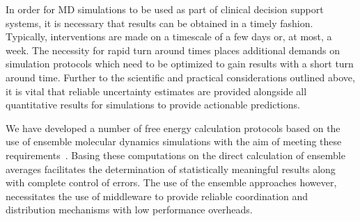 In order for MD simulations to be used as part of clinical decision support
systems, it is necessary that results can be obtained in a timely fashion.
Typically, interventions are made on a timescale of a few days or, at most, a
week. The necessity for rapid turn around times places additional demands on
simulation protocols which need to be optimized to gain results with a short
turn around time. Further to the scientific and practical considerations
outlined above, it is vital that reliable uncertainty estimates are
provided alongside all quantitative results for simulations to provide
actionable predictions.

We have developed a number of free energy calculation protocols based on the
use of ensemble molecular dynamics simulations with the aim of meeting these
requirements~\cite{Sadiq2008, Sadiq2010, Wan2017brd4, Wan2017trk}. Basing
these computations on the direct calculation of ensemble averages facilitates
the determination of statistically meaningful results along with complete
control of errors. The use of the ensemble approaches however, necessitates
the use of middleware to provide reliable coordination and distribution
mechanisms with low performance overheads.
